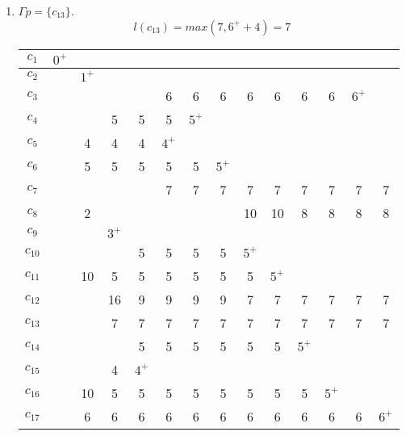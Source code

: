 \documentclass[12pt, a4paper] {ncc}
\begin{document}
\begin{enumerate}
	\item $\Gamma p = \{ c_{13}\}$.
	$$l(c_{13}) = max(7, 6^+ + 4) = 7 $$

\begin{tabular} {|c|c|c|c|c|c|c|c|c|c|c|c|c|c|}
    \hline
    $c_{1}$  &$0^+$&      &     &     &     &     &     &      &     &     &     &     &  	       \\ \hline
    $c_{2}$  & \z  &$1^+$ &     &     &     &     &     &      &     &     &     &     &  	       \\ \hline
    $c_{3}$  & \z  & \z   & \z  &\z   & 6   &  6  &  6  &  6   & 6   & 6   & 6   &$6^+$&  	       \\ \hline
    $c_{4}$  & \z  & \z   & 5   & 5   & 5   &$5^+$&     &      &     &     &     &     &  	       \\ \hline
    $c_{5}$  & \z  & 4    & 4   & 4   &$4^+$&     &     &      &     &     &     &     &  	       \\ \hline
    $c_{6}$  & \z  & 5    & 5   & 5   & 5   &  5  &$5^+$&      &     &     &     &     &  	       \\ \hline
    $c_{7}$  & \z  & \z   & \z  & \z  & 7   &  7  &  7  &  7   & 7   & 7   & 7   &7    & 7	       \\ \hline
    $c_{8}$  & \z  & 2    & \z  & \z  & \z  &  \z & \z  &  10  & 10  & 8   & 8   &8    & 8	       \\ \hline
    $c_{9}$  & \z  & \z   &$3^+$&     &     &     &     &      &     &     &     &     &  	       \\ \hline
    $c_{10}$ & \z  & \z   & \z  & 5   & 5   &  5  &  5  &$5^+$ &     &     &     &     &  	       \\ \hline
    $c_{11}$ & \z  & 10   &  5  & 5   & 5   &  5  &  5  &  5   &$5^+$&     &     &     &  	       \\ \hline
    $c_{12}$ & \z  & \z   & 16  & 9   & 9   &  9  &  9  &  7   & 7   & 7   & 7   & 7   & 7	       \\ \hline
    $c_{13}$ & \z  & \z   & 7   & 7   & 7   &  7  &  7  &  7   & 7   & 7   & 7   & 7   & 7   	   \\ \hline
    $c_{14}$ & \z  & \z   & \z  & 5   & 5   &  5  &  5  &  5   & 5   &$5^+$&     &     &  	       \\ \hline
    $c_{15}$ & \z  & \z   & 4   &$4^+$&     &     &     &      &     &     &     &     &  	       \\ \hline
    $c_{16}$ & \z  & 10   & 5   & 5   & 5   &  5  &  5  &  5   & 5   & 5   &$5^+$&     &  	       \\ \hline
    $c_{17}$ & \z  & 6    & 6   & 6   & 6   &  6  &  6  &  6   & 6   & 6   & 6   & 6   &$6^+$	   \\ \hline 
\end{tabular}


\end{enumerate}
\end{document}
